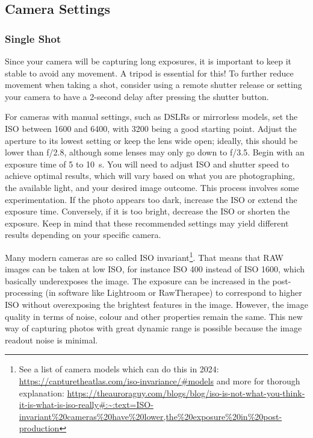 \documentclass{article}
\begin{document}
\subsection{Camera Settings}
\subsubsection{Single Shot}\label{single-shot}
Since your camera will be capturing long exposures, it is important to keep it stable to avoid any movement. A tripod is essential for this! To further reduce movement when taking a shot, consider using a remote shutter release or setting your camera to have a 2-second delay after pressing the shutter button.

For cameras with manual settings, such as DSLRs or mirrorless models, set the ISO between 1600 and 6400, with 3200 being a good starting point. Adjust the aperture to its lowest setting or keep the lens wide open; ideally, this should be lower than f/2.8, although some lenses may only go down to f/3.5. Begin with an exposure time of 5 to 10~s. You will need to adjust ISO and shutter speed to achieve optimal results, which will vary based on what you are photographing, the available light, and your desired image outcome. This process involves some experimentation. If the photo appears too dark, increase the ISO or extend the exposure time. Conversely, if it is too bright, decrease the ISO or shorten the exposure. Keep in mind that these recommended settings may yield different results depending on your specific camera.

Many modern cameras are so called ISO invariant\footnote{See a list of camera models which can do this in 2024: \url{https://capturetheatlas.com/iso-invariance/\#models} and more for thorough explanation: \url{https://theauroraguy.com/blogs/blog/iso-is-not-what-you-think-it-is-what-is-iso-really\#:~:text=ISO-invariant\%20cameras\%20have\%20lower,the\%20exposure\%20in\%20post-production}}. That means that RAW images can be taken at low ISO, for instance ISO 400 instead of ISO 1600, which basically underexposes the image. The exposure can be increased in the post-processing (in software like Lightroom or RawTherapee) to correspond to higher ISO without overexposing the brightest features in the image. However, the image quality in terms of noise, colour and other properties remain the same. This new way of capturing photos with great dynamic range is possible because the image readout noise is minimal.
\end{document}
